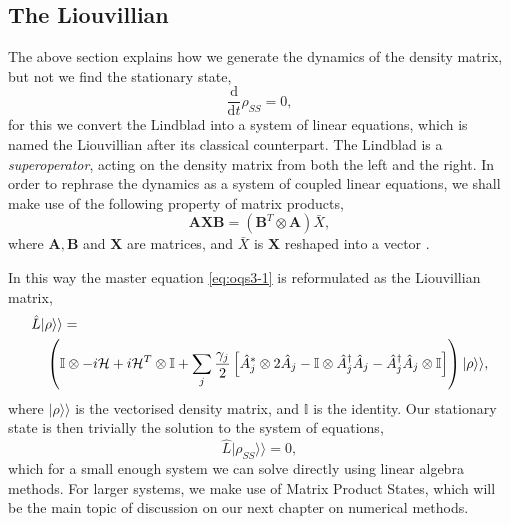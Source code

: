 \subsection{The Liouvillian}
The above section explains how we generate the dynamics of the density matrix, but not we find the stationary state,
\begin{equation}
	\frac{\mathrm{d}}{\mathrm{d}t}\rho_{SS} = 0,
	\label{eq:oqs4-1}
\end{equation}
for this we convert the Lindblad into a system of linear equations, which is named the Liouvillian after its classical counterpart. The Lindblad is a \emph{superoperator}, acting on the density matrix from both the left and the right. In order to rephrase the dynamics as a system of coupled linear equations, we shall make use of the following property of matrix products,
\begin{equation}
	 \mathbf{A}\mathbf{X}\mathbf{B} = \left(\mathbf{B}^{T} \otimes \mathbf{A}\right)\bar{X},
	 \label{eq:oqs4-2}
\end{equation}
 where \(\mathbf{A}, \mathbf{B}\) and \(\mathbf{X}\) are matrices, and \(\bar{X}\) is \(\mathbf{X}\) reshaped into a vector \cite{MO13,Roth34}. 
 
 In this way the master equation \cref{eq:oqs3-1} is reformulated as the Liouvillian matrix,
 \begin{align}
 	&\hat{L}|\rho \rangle \rangle = \notag \\ 
 	&\quad \left( \mathbb{I} \otimes -i\mathcal{H} + i\mathcal{H}^{T} \otimes \mathbb{I} + \sum_{j} \frac{\gamma_{j}}{2} \left[ \hat{A}_{j}^{*} \otimes 2\hat{A}_{j} - \mathbb{I} \otimes \hat{A}_{j}^{\dagger}\hat{A}_{j} - \hat{A}_{j}^{\dagger}\hat{A}_{j} \otimes \mathbb{I} \right]\right)|\rho\rangle\rangle,
 	\label{eq:oqs4-3}
 \end{align}
 where \(|\rho \rangle\rangle\) is the vectorised density matrix, and \(\mathbb{I}\) is the identity. Our stationary state is then trivially the solution to the system of equations,
 \begin{equation}
 	\hat{L} |\rho_{SS} \rangle\rangle = 0,
 	\label{eq:oqs4-4}
 \end{equation}
 which for a small enough system we can solve directly using linear algebra methods. For larger systems, we make use of Matrix Product States, which will be the main topic of discussion on our next chapter on numerical methods.